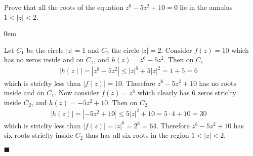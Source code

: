 \documentclass[12pt]{article}
\author{Warren Atkison}
\date{\today}
\renewcommand{\qed}{\hfill$\blacksquare$}
\renewenvironment{proof}{\vspace{1em}\begin{addmargin}[2em]{0em}\begin{newproof}}{\end{newproof}\end{addmargin}\qed}
\newenvironment{exercise}[2][Exercise]{\begin{trivlist}
\item[\hskip \labelsep {\bfseries #1} \hskip \labelsep {\bfseries #2.}]}{\end{trivlist}}
\begin{document}
\fancyhf{}
\fancyhead[R]{\today}
\fancyfoot[R]{\thepage}

\begin{exercise}{8}
	Prove that all the roots of the equation $z^6 - 5z^2 + 10 = 0$ lie in the annulus $1 < |z| < 2$.
\end{exercise}
\begin{proof}
	Let $C_1$ be the circle $|z| = 1$ and $C_2$ the circle $|z| = 2$. Consider $f(z) = 10$ which has no zeros inside and on $C_1$, and $h(z) = z^6 - 5z^2$. Then on $C_1$
	\begin{align*}
		|h(z)| = |z^6 - 5z^2| \le |z|^6 + 5|z|^2 = 1 + 5 = 6
	\end{align*}
	which is striclty less than $|f(z)| = 10$. Therefore $z^6 - 5z^2 + 10$ has no roots inside and on $C_1$. Now consider $f(z) = z^6$ which clearly has 6 zeros striclty inside $C_2$, and $h(z) = -5z^2 + 10$. Then on $C_2$
	\begin{align*}
		|h(z)| = |-5z^2 + 10| \le 5|z|^2 + 10 = 5\cdot4 + 10 = 30
	\end{align*}
	which is striclty less than $|f(z)| = |z|^6 = 2^6 = 64$. Therefore $z^6 - 5z^2 + 10$ has six roots striclty inside $C_2$ thus has all six roots in the region $1 < |z| < 2$.
\end{proof}
\end{document}
